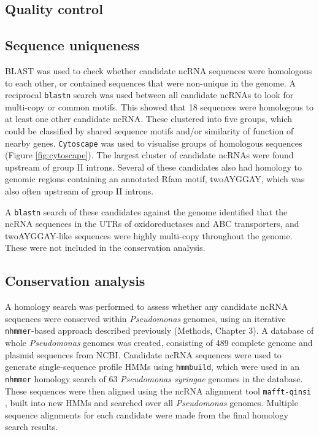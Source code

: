 \subsection{Quality control}

\subsection{Sequence uniqueness}

BLAST \citep{Altschul1990-knr} was used to check whether candidate ncRNA sequences were homologous to each other, or contained sequences that were non-unique in the genome. A reciprocal \texttt{blastn} search was used between all candidate ncRNAs to look for multi-copy or common motifs. This showed that 18 sequences were homologous to at least one other candidate ncRNA. These clustered into five groups, which could be classified by shared sequence motifs and/or similarity of function of nearby genes. \texttt{Cytoscape} \citep{Shannon2003-uv} was used to visualise groups of homologous sequences (Figure \ref{fig:cytoscape}). 
The largest cluster of candidate ncRNAs were found upstream of group II introns. Several of these candidates also had homology to genomic regions containing an annotated Rfam motif, twoAYGGAY, which was also often upstream of group II introns.

A \texttt{blastn} search of these candidates against the genome identified that the ncRNA sequences in the UTRs of oxidoreductases and ABC transporters, and twoAYGGAY-like sequences were highly multi-copy throughout the genome. These were not included in the conservation analysis.  


\subsection{Conservation analysis}

A homology search was performed to assess whether any candidate ncRNA sequences were conserved within \textit{Pseudomonas} genomes, using an iterative \texttt{nhmmer}-based \citep{Wheeler2013-qlw} approach described previously (Methods, Chapter 3). A database of whole \textit{Pseudomonas} genomes was created, consisting of 489 complete genome and plasmid sequences from NCBI. Candidate ncRNA sequences were used to generate single-sequence profile HMMs using \texttt{hmmbuild}, which were used in an \texttt{nhmmer} homology search of 63 \textit{Pseudomonas syringae} genomes in the database. These sequences were then aligned using the ncRNA alignment tool \texttt{mafft-qinsi} \citep{Katoh2013x}, built into new HMMs and searched over all \textit{Pseudomonas} genomes. Multiple sequence alignments for each candidate were made from the final homology search results.

